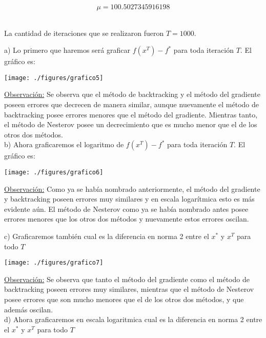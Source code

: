 \documentclass[11pt]{article}
\begin{document}
\[ \mu = 100.5027345916198 \] \

La cantidad de iteraciones que se realizaron fueron $T=1000$. \\

\newpage

a) Lo primero que haremos será graficar $ f(x^T) - f^{*}$ para toda iteración $T$. El gráfico es:

\begin{center}
\texttt{[image: ./figures/grafico5]}
\end{center}

\underline{Observación:} Se observa que el método de backtracking y el método del gradiente poseen errores que decrecen de manera similar, aunque nuevamente el método de backtracking posee errores menores que el método del gradiente. Mientras tanto, el método de Nesterov posee un decrecimiento que es mucho menor que el de los otros dos métodos.  \\

b) Ahora graficaremos el logaritmo de $ f(x^T) - f^{*}$ para toda iteración $T$. El gráfico es:

\begin{center}
\texttt{[image: ./figures/grafico6]}
\end{center}

\underline{Observación:} Como ya se había nombrado anteriormente, el método del gradiente y backtracking poseen errores muy similares y en escala logarítmica esto es más evidente aún. El método de Nesterov como ya se había nombrado antes posee errores menores que los otros dos métodos y nuevamente estos errores oscilan. \\

\newpage

c) Graficaremos también cual es la diferencia en norma 2 entre el $x^{*}$ y $x^T$ para todo $T$ \\

\begin{center}
\texttt{[image: ./figures/grafico7]}
\end{center}

\underline{Observación:} Se observa que tanto el método del gradiente como el método de backtracking poseen errores muy similares, mientras que el método de Nesterov posee errores que son mucho menores que el de los otros dos métodos, y que además oscilan.  \\

d) Ahora graficaremos en escala logaritmica cual es la diferencia en norma 2 entre el $x^{*}$ y $x^T$ para todo $T$ \\
\end{document}
